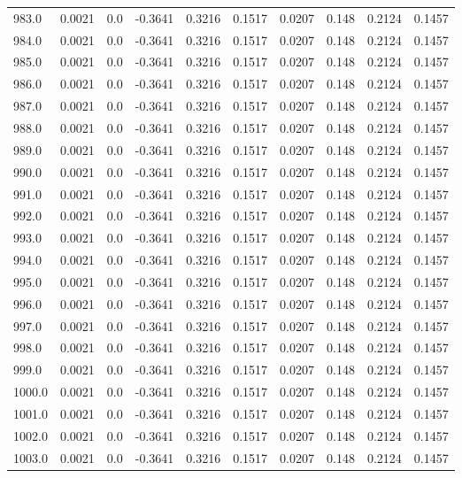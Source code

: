 \begin{longtable}{lrrrrrrrrr}
983.0 & 0.0021 & 0.0 & -0.3641 & 0.3216 & 0.1517 & 0.0207 & 0.148 & 0.2124 & 0.1457 \\
984.0 & 0.0021 & 0.0 & -0.3641 & 0.3216 & 0.1517 & 0.0207 & 0.148 & 0.2124 & 0.1457 \\
985.0 & 0.0021 & 0.0 & -0.3641 & 0.3216 & 0.1517 & 0.0207 & 0.148 & 0.2124 & 0.1457 \\
986.0 & 0.0021 & 0.0 & -0.3641 & 0.3216 & 0.1517 & 0.0207 & 0.148 & 0.2124 & 0.1457 \\
987.0 & 0.0021 & 0.0 & -0.3641 & 0.3216 & 0.1517 & 0.0207 & 0.148 & 0.2124 & 0.1457 \\
988.0 & 0.0021 & 0.0 & -0.3641 & 0.3216 & 0.1517 & 0.0207 & 0.148 & 0.2124 & 0.1457 \\
989.0 & 0.0021 & 0.0 & -0.3641 & 0.3216 & 0.1517 & 0.0207 & 0.148 & 0.2124 & 0.1457 \\
990.0 & 0.0021 & 0.0 & -0.3641 & 0.3216 & 0.1517 & 0.0207 & 0.148 & 0.2124 & 0.1457 \\
991.0 & 0.0021 & 0.0 & -0.3641 & 0.3216 & 0.1517 & 0.0207 & 0.148 & 0.2124 & 0.1457 \\
992.0 & 0.0021 & 0.0 & -0.3641 & 0.3216 & 0.1517 & 0.0207 & 0.148 & 0.2124 & 0.1457 \\
993.0 & 0.0021 & 0.0 & -0.3641 & 0.3216 & 0.1517 & 0.0207 & 0.148 & 0.2124 & 0.1457 \\
994.0 & 0.0021 & 0.0 & -0.3641 & 0.3216 & 0.1517 & 0.0207 & 0.148 & 0.2124 & 0.1457 \\
995.0 & 0.0021 & 0.0 & -0.3641 & 0.3216 & 0.1517 & 0.0207 & 0.148 & 0.2124 & 0.1457 \\
996.0 & 0.0021 & 0.0 & -0.3641 & 0.3216 & 0.1517 & 0.0207 & 0.148 & 0.2124 & 0.1457 \\
997.0 & 0.0021 & 0.0 & -0.3641 & 0.3216 & 0.1517 & 0.0207 & 0.148 & 0.2124 & 0.1457 \\
998.0 & 0.0021 & 0.0 & -0.3641 & 0.3216 & 0.1517 & 0.0207 & 0.148 & 0.2124 & 0.1457 \\
999.0 & 0.0021 & 0.0 & -0.3641 & 0.3216 & 0.1517 & 0.0207 & 0.148 & 0.2124 & 0.1457 \\
1000.0 & 0.0021 & 0.0 & -0.3641 & 0.3216 & 0.1517 & 0.0207 & 0.148 & 0.2124 & 0.1457 \\
1001.0 & 0.0021 & 0.0 & -0.3641 & 0.3216 & 0.1517 & 0.0207 & 0.148 & 0.2124 & 0.1457 \\
1002.0 & 0.0021 & 0.0 & -0.3641 & 0.3216 & 0.1517 & 0.0207 & 0.148 & 0.2124 & 0.1457 \\
1003.0 & 0.0021 & 0.0 & -0.3641 & 0.3216 & 0.1517 & 0.0207 & 0.148 & 0.2124 & 0.1457 \\

\end{longtable}
